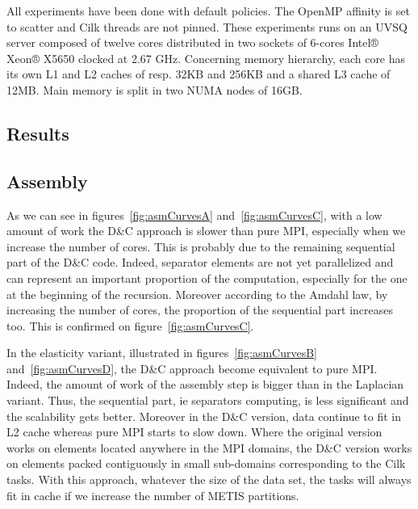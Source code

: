 \documentclass{IOS-Book-Article}
\begin{document}
All experiments have been done with default policies. The OpenMP affinity is set to scatter and Cilk threads are not pinned.
These experiments runs on an UVSQ server composed of twelve cores distributed in two sockets of 6-cores Intel® Xeon® X5650 clocked at 2.67 GHz.
Concerning memory hierarchy, each core has its own L1 and L2 caches of resp. 32KB and 256KB and a shared L3 cache of 12MB. Main memory is split in two NUMA nodes of 16GB.

\subsection{Results}
\subsection{Assembly}
As we can see in figures~\ref{fig:asmCurvesA} and~\ref{fig:asmCurvesC}, with a low amount of work the D\&C approach is slower than pure MPI, especially when we increase
the number of cores.
This is probably due to the remaining sequential part of the D\&C code.
Indeed, separator elements are not yet parallelized and can represent an important proportion of the computation, especially for the one at the beginning of the recursion.
Moreover according to the Amdahl law, by increasing the number of cores, the proportion of the sequential part increases too. This is confirmed on figure~\ref{fig:asmCurvesC}.

In the elasticity variant, illustrated in figures~\ref{fig:asmCurvesB} and~\ref{fig:asmCurvesD}, the D\&C approach become equivalent to pure MPI.
Indeed, the amount of work of the assembly step is bigger than in the Laplacian variant.
Thus, the sequential part, ie separators computing, is less significant and the scalability gets better.
Moreover in the D\&C version, data continue to fit in L2 cache whereas pure MPI starts to slow down.
Where the original version works on elements located anywhere in the MPI domains, the D\&C version works on elements packed contiguously in small sub-domains corresponding
to the Cilk tasks.
With this approach, whatever the size of the data set, the tasks will always fit in cache if we increase the number of METIS partitions.
\end{document}
